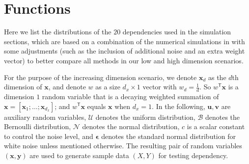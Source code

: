 \documentclass[11pt]{article}
\newcommand{\T}{^{\ensuremath{\mathsf{T}}}}           %
\providecommand{\mb}[1]{\boldsymbol{#1}}
\providecommand{\mc}[1]{\mathcal{#1}}
\begin{document}
\section{Functions}
\label{appen:function}

Here we list the distributions of the $20$ dependencies used in the simulation sections, which are based on a combination of the numerical simulations in \cite{SzekelyRizzoBakirov2007, SimonTibshirani2012, SimonTibshirani2012, GorfineHellerHeller2012} with some adjustments (such as the inclusion of additional noise and an extra weight vector) to better compare all methods in our low and high dimension scenarios.

For the purpose of the increasing dimension scenario, we denote $\mb{x}_{d}$ as the $d$th dimension of $\mb{x}$, and denote $w$ as a size $d_{x} \times 1$ vector with $w_{d}=\frac{1}{d}$. So $w\T \mb{x}$ is a dimension $1$ random variable that is a decaying weighted summation of $\mb{x}=[\mb{x}_{1};\ldots;\mb{x}_{d_{x}}]$; and $w\T \mb{x}$ equals $\mb{x}$ when $d_{x}=1$. In the following, $\mb{u}, \mb{v}$ are auxiliary random variables, $\mc{U}$ denotes the uniform distribution, $\mc{B}$ denotes the Bernoulli distribution, $\mc{N}$ denotes the normal distribution, $c$ is a scalar constant to control the noise level, and $\mb{\epsilon}$ denotes the standard normal distribution for white noise unless mentioned otherwise. The resulting pair of random variables $(\mb{x},\mb{y})$ are used to generate sample data $(X,Y)$ for testing dependency.
\end{document}
